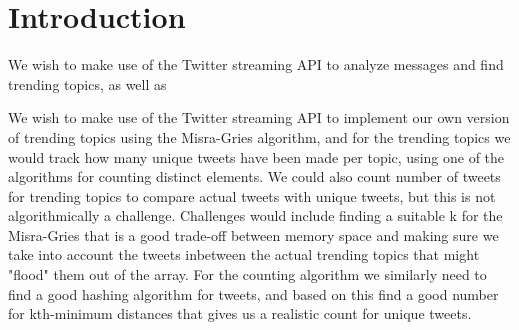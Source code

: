 \section{Introduction}
\label{intro}
We wish to make use of the Twitter streaming API to analyze messages and find trending topics, as well as

We wish to make use of the Twitter streaming API to implement our own version of trending topics using the Misra-Gries algorithm, and for the trending topics we would track how many unique tweets have been made per topic, using one of the algorithms for counting distinct elements. We could also count number of tweets for trending topics to compare actual tweets with unique tweets, but this is not algorithmically a challenge.
\newline\newline
Challenges would include finding a suitable k for the Misra-Gries that is a good trade-off between memory space and making sure we take into account the tweets inbetween the actual trending topics that might "flood" them out of the array.
\newline\newline
For the counting algorithm we similarly need to find a good hashing algorithm for tweets, and based on this find a good number for kth-minimum distances that gives us a realistic count for unique tweets.